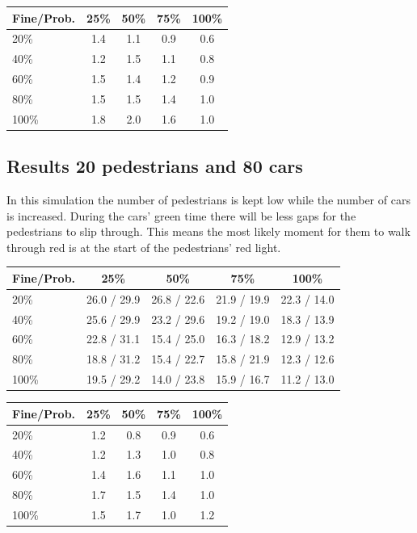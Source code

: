 \documentclass[a4paper]{article}
\begin{document}
\begin{table}[H]
\centering
\begin{tabular}{ l | c c c c }
  Fine\slash Prob. & 25\% & 50\% & 75\% & 100\% \\ 
  \hline
  20\%  & 1.4 & 1.1 & 0.9 & 0.6  \\
  40\%  & 1.2 & 1.5 & 1.1 & 0.8  \\
  60\%  & 1.5 & 1.4 & 1.2 & 0.9  \\
  80\%  & 1.5 & 1.5 & 1.4 & 1.0  \\
  100\% & 1.8 & 2.0 & 1.6 & 1.0  \\
\end{tabular}
\end{table}

\clearpage
\subsection{Results 20 pedestrians and 80 cars}
In this simulation the number of pedestrians is kept low while the number of cars is increased. During the cars' green time there will be less gaps for the pedestrians to slip through. This means the most likely moment for them to walk through red is at the start of the pedestrians' red light.

\begin{table}[H]
\centering
\begin{tabular}{ l | c c c c }
  Fine\slash Prob. & 25\% & 50\% & 75\% & 100\% \\ 
  \hline
  20\%  & 26.0 / 29.9 & 26.8 / 22.6 & 21.9 / 19.9 & 22.3 / 14.0  \\
  40\%  & 25.6 / 29.9 & 23.2 / 29.6 & 19.2 / 19.0 & 18.3 / 13.9  \\
  60\%  & 22.8 / 31.1 & 15.4 / 25.0 & 16.3 / 18.2 & 12.9 / 13.2  \\
  80\%  & 18.8 / 31.2 & 15.4 / 22.7 & 15.8 / 21.9 & 12.3 / 12.6  \\
  100\% & 19.5 / 29.2 & 14.0 / 23.8 & 15.9 / 16.7 & 11.2 / 13.0  \\
\end{tabular}
\end{table}

\begin{table}[H]
\centering
\begin{tabular}{ l | c c c c }
  Fine\slash Prob. & 25\% & 50\% & 75\% & 100\% \\ 
  \hline
  20\%  & 1.2 & 0.8 & 0.9 & 0.6  \\
  40\%  & 1.2 & 1.3 & 1.0 & 0.8  \\
  60\%  & 1.4 & 1.6 & 1.1 & 1.0  \\
  80\%  & 1.7 & 1.5 & 1.4 & 1.0  \\
  100\% & 1.5 & 1.7 & 1.0 & 1.2  \\
\end{tabular}
\end{table}
\end{document}
